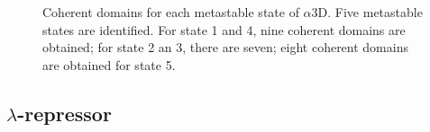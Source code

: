 \documentclass[12pt]{article}
\begin{document}

\begin{figure}[htbp]
  \addtocounter{subfigure}{3}
  \\
  \\
  \caption{\label{A3D}Coherent domains for each metastable state of $\alpha$3D. Five metastable states are identified. For state 1 and 4, nine coherent domains are obtained; for state 2 an 3, there are seven; eight coherent domains are obtained for state 5.}
\end{figure}

\clearpage

\subsection*{$\lambda$-repressor}
\end{document}
